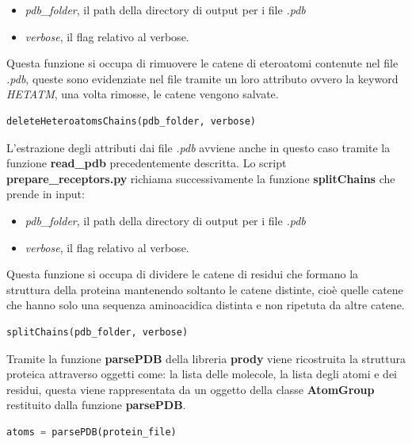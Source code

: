\begin{itemize}
    \item \textit{pdb\_folder}, il path della directory di output per i file \textit{.pdb}
    \item \textit{verbose}, il flag relativo al verbose.
\end{itemize}

Questa funzione si occupa di rimuovere le catene di eteroatomi contenute nel file \textit{.pdb}, queste sono evidenziate nel file tramite un loro attributo ovvero la keyword \textit{HETATM}, una volta rimosse, le catene vengono salvate. 

\begin{lstlisting}[language=Python, label=lst:code21, caption={funzione deleteHeteroatomsChains}]
deleteHeteroatomsChains(pdb_folder, verbose)
\end{lstlisting}

L'estrazione degli attributi dai file \textit{.pdb} avviene anche in questo caso tramite la funzione \textbf{read\_pdb} precedentemente descritta.\newline
Lo script \textbf{prepare\_receptors.py} richiama successivamente la funzione \textbf{splitChains} che prende in input: 

\begin{itemize}
    \item \textit{pdb\_folder}, il path della directory di output per i file \textit{.pdb}
    \item \textit{verbose}, il flag relativo al verbose.
\end{itemize}

Questa funzione si occupa di dividere le catene di residui che formano la struttura della proteina mantenendo soltanto le catene distinte, cioè quelle catene che hanno solo una sequenza aminoacidica distinta e non ripetuta da altre catene. 

\begin{lstlisting}[language=Python, label=lst:code22, caption={funzione splitChains}]
splitChains(pdb_folder, verbose)    
\end{lstlisting}

Tramite la funzione \textbf{parsePDB} della libreria \textbf{prody} viene ricostruita la struttura proteica attraverso oggetti come: la lista delle molecole, la lista degli atomi e dei residui, questa viene rappresentata da un oggetto della classe \textbf{AtomGroup} restituito dalla funzione \textbf{parsePDB}.

\begin{lstlisting}[language=Python, label=lst:code23, caption={funzione parsePDB}]
atoms = parsePDB(protein_file)
\end{lstlisting}

